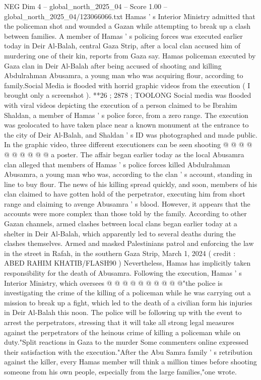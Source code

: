 \begin{textsample}{NEG Dim 4 – global\_north\_2025\_04 – Score 1.00 – global\_north\_2025\_04/123066066.txt}  \label{ex:f4_neg_246}
Hamas ' s Interior Ministry admitted that the policeman shot and wounded a Gazan while attempting to break up a clash between families.
A member of Hamas ' s policing forces was executed earlier today in Deir Al-Balah, central Gaza Strip, after a local clan accused him of murdering one of their kin, reports from Gaza say.
Hamas policeman executed by Gaza clan in Deir Al-Balah after being accused of shooting and killing Abdulrahman Abusamra, a young man who was acquiring flour, according to family.Social Media is flooded with horrid graphic videos from the execution ( I brought only a screenshot ). **26 ; 2878 ; TOOLONG Social media was flooded with viral videos depicting the execution of a person claimed to be Ibrahim Shaldan, a member of Hamas ' s police force, from a zero range.
The execution was geolocated to have taken place near a known monument at the entrance to the city of Deir Al-Balah, and Shaldan ' s ID was photographed and made public.
In the graphic video, three different executioners can be seen shooting @ @ @ @ @ @ @ @ @ @ a poster.
The affair began earlier today as the local Abusamra clan alleged that members of Hamas ' s police forces killed Abdulrahman Abusamra, a young man who was, according to the clan ' s account, standing in line to buy flour.
The news of his killing spread quickly, and soon, members of his clan claimed to have gotten hold of the perpetrator, executing him from short range and claiming to avenge Abusamra ' s blood.
However, it appears that the accounts were more complex than those told by the family.
According to other Gazan channels, armed clashes between local clans began earlier today at a shelter in Deir Al-Balah, which apparently led to several deaths during the clashes themselves.
Armed and masked Palestinians patrol and enforcing the law in the street in Rafah, in the southern Gaza Strip, March 1, 2024 ( credit : ABED RAHIM KHATIB/FLASH90 ) Nevertheless, Hamas has implicitly taken responsibility for the death of Abusamra.
Following the execution, Hamas ' s Interior Ministry, which oversees @ @ @ @ @ @ @ @ @ @"the police is investigating the crime of the killing of a policeman while he was carrying out a mission to break up a fight, which led to the death of a civilian form his injuries in Deir Al-Balah this noon.
The police will be following up with the event to arrest the perpetrators, stressing that it will take all strong legal measures against the perpetrators of the heinous crime of killing a policeman while on duty."Split reactions in Gaza to the murder Some commenters online expressed their satisfaction with the execution."After the Abu Samra family ' s retribution against the killer, every Hamas member will think a million times before shooting someone from his own people, especially from the large families,"one wrote.

\end{textsample}
